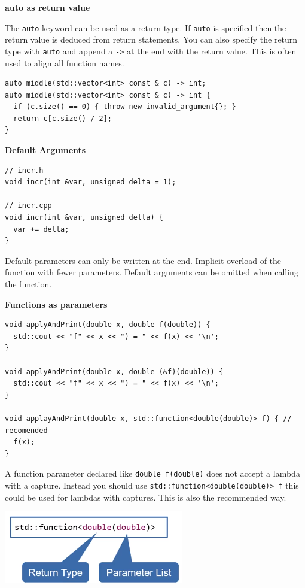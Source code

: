\documentclass[11pt,twoside,landscape]{article}
\begin{document}
\begin{multicols}{3}
\textbf{auto as return value}

The \texttt{auto} keyword can be used as a return type. If \texttt{auto} is specified then the return value is deduced from return statements. You can also specify the return type with \texttt{auto} and append a \texttt{->} at the end with the return value. This is often used to align all function names.

\lstset{language=c++,label= ,caption= ,captionpos=b,numbers=none}
\begin{lstlisting}
auto middle(std::vector<int> const & c) -> int;
auto middle(std::vector<int> const & c) -> int {
  if (c.size() == 0) { throw new invalid_argument{}; }
  return c[c.size() / 2];
}
\end{lstlisting}

\textbf{Default Arguments}

\lstset{language=c++,label= ,caption= ,captionpos=b,numbers=none}
\begin{lstlisting}
// incr.h
void incr(int &var, unsigned delta = 1);

// incr.cpp
void incr(int &var, unsigned delta) {
  var += delta;
}
\end{lstlisting}

Default parameters can only be written at the end.
Implicit overload of the function with fewer parameters.
Default arguments can be omitted when calling the function.

\textbf{Functions as parameters}

\lstset{language=c++,label= ,caption= ,captionpos=b,numbers=none}
\begin{lstlisting}
void applyAndPrint(double x, double f(double)) {
  std::cout << "f" << x << ") = " << f(x) << '\n';
}

void applyAndPrint(double x, double (&f)(double)) {
  std::cout << "f" << x << ") = " << f(x) << '\n';
}

void applayAndPrint(double x, std::function<double(double)> f) { // recomended
  f(x);
}
\end{lstlisting}

A function parameter declared like \texttt{double f(double)} does not accept a lambda with a capture.
Instead you should use \texttt{std::function<double(double)> f} this could be used for lambdas with captures.
This is also the recommended way.

{
\begin{center}
\includegraphics[width=.9\linewidth]{img/std_function.png}
\end{center}
}



\end{multicols}
\end{document}
